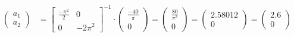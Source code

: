 \documentclass[
final,
a4paper,
oneside,
parskip=full,
headings=standardclasses,
headings=big,
pointednumbers,
fleqn
]{scrartcl}
\newcommand{\f}[2]{\frac{#1}{#2}}
\begin{document}
    {\setlength{\abovedisplayskip}{6pt}
    \setlength{\belowdisplayskip}{-12pt}
    \begin{align*}
        \begin{pmatrix}
            a_1 \\
            a_2
        \end{pmatrix} & =
        \begin{bmatrix}
            \f{-\pi^2}{2} & 0 \\
            0             & -2\pi^2
        \end{bmatrix}^{-1} \cdot
        \begin{pmatrix}
            \f{-40}{\pi} \\
            0
        \end{pmatrix} =
        \begin{pmatrix}
            \f{80}{\pi^3} \\
            0
        \end{pmatrix} =
        \begin{pmatrix}
            2.58012 \\
            0
        \end{pmatrix} =
        \begin{pmatrix}
            2.6 \\
            0
        \end{pmatrix}
    \end{align*}}
    
\end{document}
